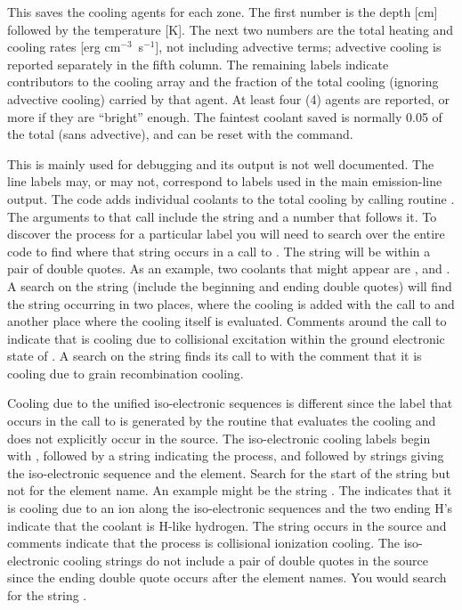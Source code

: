 This saves the cooling agents for each zone.  The first number is the
depth [cm] followed by the temperature [K].  The next two numbers are the
total heating and cooling rates [erg cm$^{-3}$~s$^{-1}$], not including
advective terms; advective cooling is reported separately in the fifth column.
The remaining labels indicate contributors to the cooling array and the
fraction of the total cooling (ignoring advective cooling) carried by that agent.
At least four (4) agents are reported, or more if they are ``bright'' enough.
The faintest coolant saved is normally 0.05 of the total (sans advective),
and can be reset with the  command.

This is mainly used for debugging and its output is not well documented.
The line labels may, or may not, correspond to labels used in the main
emission-line output.  The code adds individual coolants to the total cooling
by calling routine .
The arguments to that call include the string
and a number that follows it.   To discover the process for a particular
label you will need to search over the entire code to find where that string
occurs in a call to .
The string will be within a pair of double
quotes.
As an example, two coolants that might appear are
, and .  A search on the string  (include the beginning and ending double
quotes) will find the string occurring in two places, where the cooling
is added with the call to  and another place where the cooling itself
is evaluated.  Comments around the call to 
indicate that  is
cooling due to collisional excitation within the ground electronic state
of \htwo.   A search on the string  finds its call to
 with
the comment that it is cooling due to grain recombination cooling.

Cooling due to the unified iso-electronic sequences is different since
the label that occurs in the call to  is generated by the routine
that evaluates the cooling and does not explicitly occur in the source.
The iso-electronic cooling labels begin with ,
followed by a string
indicating the process, and followed by strings giving the iso-electronic
sequence and the element.  Search for the start of the string but not for
the element name.  An example might be the string
.  The 
indicates that it is cooling due to an ion along the iso-electronic sequences
and the two ending H's indicate that the coolant is H-like hydrogen.  The
string  occurs in the source and comments indicate that the process
is collisional ionization cooling.  The iso-electronic cooling strings do
not include a pair of double quotes in the source since the ending double
quote occurs after the element names.  You would search for the string
.


